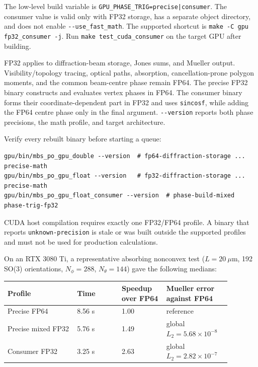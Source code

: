 \documentclass[
  10pt,
  a4paper,
]{article}
\begin{document}
The low-level build variable is
\texttt{GPU\_PHASE\_TRIG=precise|consumer}. The consumer value is valid only
with FP32 storage, has a separate object directory, and does not enable
\texttt{-{}-use\_fast\_math}. The supported shortcut is
\texttt{make -C gpu fp32\_consumer -j}. Run
\texttt{make test\_cuda\_consumer} on the target GPU after building.

FP32 applies to diffraction-beam storage, Jones sums, and Mueller output.
Visibility/topology tracing, optical paths, absorption, cancellation-prone
polygon moments, and the common beam-centre phase remain FP64. The precise
FP32 binary constructs and evaluates vertex phases in FP64. The consumer
binary forms their coordinate-dependent part in FP32 and uses
\texttt{sincosf}, while adding the FP64 centre phase only in the final
argument. \texttt{-{}-version} reports both phase precisions, the math profile,
and target architecture.

Verify every rebuilt binary before starting a queue:

\begin{verbatim}
gpu/bin/mbs_po_gpu_double --version  # fp64-diffraction-storage ... precise-math
gpu/bin/mbs_po_gpu_float --version   # fp32-diffraction-storage ... precise-math
gpu/bin/mbs_po_gpu_float_consumer --version  # phase-build-mixed phase-trig-fp32
\end{verbatim}

CUDA host compilation requires exactly one FP32/FP64 profile. A binary that
reports \texttt{unknown-precision} is stale or was built outside the supported
profiles and must not be used for production calculations.

On an RTX 3080 Ti, a representative absorbing nonconvex test
($L=20\ \mu\mathrm{m}$, 192 SO(3) orientations,
$N_\phi=288$, $N_\theta=144$) gave the following medians:

\begin{longtable}[]{@{}L{0.28\linewidth}L{0.18\linewidth}L{0.18\linewidth}L{0.24\linewidth}@{}}
\toprule\noalign{}
Profile & Time & Speedup over FP64 & Mueller error against FP64 \\
\midrule\noalign{}
\endhead
\bottomrule\noalign{}
\endlastfoot
Precise FP64 & 8.56 s & 1.00 & reference \\
Precise mixed FP32 & 5.76 s & 1.49 & global $L_2=5.68\times10^{-8}$ \\
Consumer FP32 & 3.25 s & 2.63 & global $L_2=2.82\times10^{-7}$ \\
\end{longtable}
\end{document}

